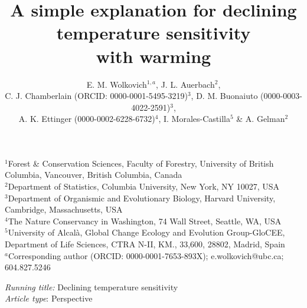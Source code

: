 \documentclass[11pt,letter]{article}
\begin{document}
\title{A simple explanation for declining temperature sensitivity \\ with warming} %
\author{E. M. Wolkovich$^{1,a}$,  J. L. Auerbach$^{2}$, \\C. J. Chamberlain (ORCID: 0000-0001-5495-3219)$^{3}$, D. M. Buonaiuto (0000-0003-4022-2591)$^{3}$, \\ A. K. Ettinger (0000-0002-6228-6732)$^4$, I. Morales-Castilla$^{5}$ \& A. Gelman$^{2}$} 
\date{} %
\maketitle
$^1$Forest \& Conservation Sciences, Faculty of Forestry, University of British Columbia, Vancouver, British Columbia, Canada\\
$^2$Department of Statistics, Columbia University, New York, NY 10027, USA\\
$^3$Department of Organismic and Evolutionary Biology, Harvard University, Cambridge, Massachusetts, USA\\
$^4$The Nature Conservancy in Washington, 74 Wall Street, Seattle, WA, USA\\
$^5$University of Alcal\`a, Global Change Ecology and Evolution Group-GloCEE, Department of Life Sciences, CTRA N-II, KM., 33,600, 28802, Madrid, Spain\\
$^a$Corresponding author (ORCID: 0000-0001-7653-893X); e.wolkovich@ubc.ca; 604.827.5246
\vspace{3ex}

\emph{Running title:} Declining temperature sensitivity\\
\emph{Article type}: Perspective\\

\end{document}
